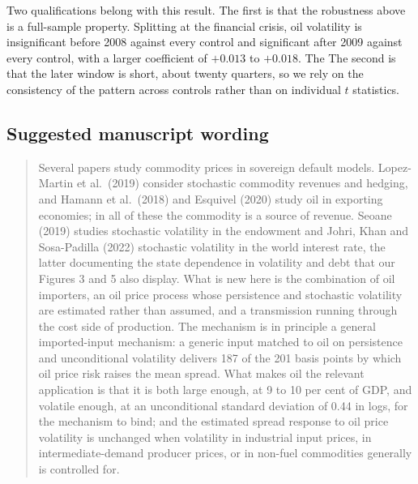 Two qualifications belong with this result. The first is that the robustness
above is a full-sample property. Splitting at the financial crisis, oil volatility is
insignificant before 2008 against every control and significant after 2009
against every control, with a larger coefficient of $+0.013$ to $+0.018$. The
The second is that the later window is short, about twenty quarters, so we rely
on the consistency of the pattern across controls rather than on individual $t$
statistics.

\subsection*{Suggested manuscript wording}

\begin{quote}
Several papers study commodity prices in sovereign default models. Lopez-Martin
et al.\ (2019) consider stochastic commodity revenues and hedging, and Hamann
et al.\ (2018) and Esquivel (2020) study oil in exporting economies; in all of
these the commodity is a source of revenue. Seoane (2019) studies stochastic
volatility in the endowment and Johri, Khan and Sosa-Padilla (2022) stochastic
volatility in the world interest rate, the latter documenting the state
dependence in volatility and debt that our Figures 3 and 5 also display. What is
new here is the combination of oil importers, an oil price process whose
persistence and stochastic volatility are estimated rather than assumed, and a
transmission running through the cost side of production. The mechanism is in
principle a general imported-input mechanism: a generic input matched to oil on
persistence and unconditional volatility delivers 187 of the 201 basis points by
which oil price risk raises the mean spread. What makes oil the relevant
application is that it is both large enough, at 9 to 10 per cent of GDP, and
volatile enough, at an unconditional standard deviation of 0.44 in logs, for the
mechanism to bind; and the estimated spread response to oil price volatility is
unchanged when volatility in industrial input prices, in intermediate-demand
producer prices, or in non-fuel commodities generally is controlled for.
\end{quote}
